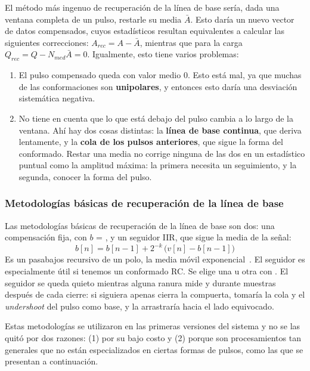 El método más ingenuo de recuperación de la línea de base sería, dada una
ventana completa de un pulso, restarle su media $\bar A$. Esto daría un nuevo
vector de datos compensados, cuyos estadísticos resultan equivalentes a
calcular las siguientes correcciones: $A_{rec} = A - \bar A$, mientras que para
la carga $Q_{rec} = Q - N_{med} \bar A=0$. Igualmente, esto tiene varios
problemas:
\begin{enumerate}
  \item El pulso compensado queda con valor medio 0. Esto está mal, ya que
    muchas de las conformaciones son \textbf{unipolares}, y entonces esto daría
    una desviación sistemática negativa.
  \item No tiene en cuenta que lo que está debajo del pulso cambia a lo largo de
    la ventana. Ahí hay dos cosas distintas: la \textbf{línea de base continua},
    que deriva lentamente, y la \textbf{cola de los pulsos anteriores}, que
    sigue la forma del conformado. Restar una media no corrige ninguna de las
    dos en un estadístico puntual como la amplitud máxima: la primera necesita
    un seguimiento, y la segunda, conocer la forma del pulso.
\end{enumerate}

\subsubsection{Metodologías básicas de recuperación de la línea de base}
\label{S:implmca-lb-basicas}

Las metodologías básicas de recuperación de la línea de base son dos: una
compensación fija, con $b$ = , y un seguidor IIR, que
sigue la media de la señal:
\begin{equation}
  b[n] = b[n-1] + 2^{-k}\,\big(v[n] - b[n-1]\big)
  \label{e:implmca-iir}
\end{equation}
Es un pasabajos recursivo de un polo, la media móvil
exponencial~. El seguidor es especialmente útil si
tenemos un conformado RC. Se elige una u otra con . El
seguidor se queda quieto mientras alguna ranura mide y durante
 muestras después de cada cierre: si siguiera apenas
cierra la compuerta, tomaría la cola y el \emph{undershoot} del pulso como base,
y la arrastraría hacia el lado equivocado.

Estas metodologías se utilizaron en las primeras versiones del sistema y no se
las quitó por dos razones: (1) por su bajo costo y (2) porque son procesamientos
tan generales que no están especializados en ciertas formas de pulsos, como las
que se presentan a continuación.

